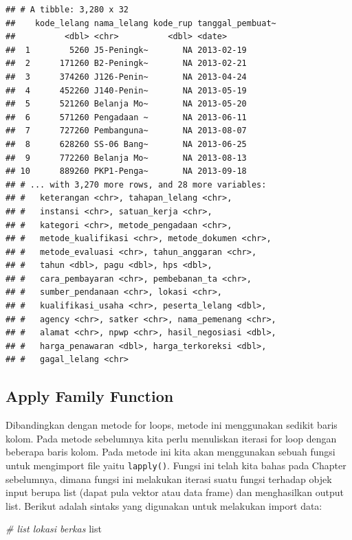 \documentclass[]{book}
\newenvironment{Shaded}{\begin{snugshade}}{\end{snugshade}}
\newcommand{\CommentTok}[1]{\textcolor[rgb]{0.56,0.35,0.01}{\textit{#1}}}
\newcommand{\NormalTok}[1]{#1}
\begin{document}
\begin{verbatim}
## # A tibble: 3,280 x 32
##    kode_lelang nama_lelang kode_rup tanggal_pembuat~
##          <dbl> <chr>          <dbl> <date>          
##  1        5260 J5-Peningk~       NA 2013-02-19      
##  2      171260 B2-Peningk~       NA 2013-02-21      
##  3      374260 J126-Penin~       NA 2013-04-24      
##  4      452260 J140-Penin~       NA 2013-05-19      
##  5      521260 Belanja Mo~       NA 2013-05-20      
##  6      571260 Pengadaan ~       NA 2013-06-11      
##  7      727260 Pembanguna~       NA 2013-08-07      
##  8      628260 SS-06 Bang~       NA 2013-06-25      
##  9      772260 Belanja Mo~       NA 2013-08-13      
## 10      889260 PKP1-Penga~       NA 2013-09-18      
## # ... with 3,270 more rows, and 28 more variables:
## #   keterangan <chr>, tahapan_lelang <chr>,
## #   instansi <chr>, satuan_kerja <chr>,
## #   kategori <chr>, metode_pengadaan <chr>,
## #   metode_kualifikasi <chr>, metode_dokumen <chr>,
## #   metode_evaluasi <chr>, tahun_anggaran <chr>,
## #   tahun <dbl>, pagu <dbl>, hps <dbl>,
## #   cara_pembayaran <chr>, pembebanan_ta <chr>,
## #   sumber_pendanaan <chr>, lokasi <chr>,
## #   kualifikasi_usaha <chr>, peserta_lelang <dbl>,
## #   agency <chr>, satker <chr>, nama_pemenang <chr>,
## #   alamat <chr>, npwp <chr>, hasil_negosiasi <dbl>,
## #   harga_penawaran <dbl>, harga_terkoreksi <dbl>,
## #   gagal_lelang <chr>
\end{verbatim}

\subsection{Apply Family Function}\label{apply-family-function}

Dibandingkan dengan metode for loops, metode ini menggunakan sedikit
baris kolom. Pada metode sebelumnya kita perlu menuliskan iterasi for
loop dengan beberapa baris kolom. Pada metode ini kita akan menggunakan
sebuah fungsi untuk mengimport file yaitu \texttt{lapply()}. Fungsi ini
telah kita bahas pada Chapter sebelumnya, dimana fungsi ini melakukan
iterasi suatu fungsi terhadap objek input berupa list (dapat pula vektor
atau data frame) dan menghasilkan output list. Berikut adalah sintaks
yang digunakan untuk melakukan import data:

\begin{Shaded}
\begin{Highlighting}[]
\CommentTok{# list lokasi berkas}
\NormalTok{list}
\end{Highlighting}
\end{Shaded}
\end{document}
